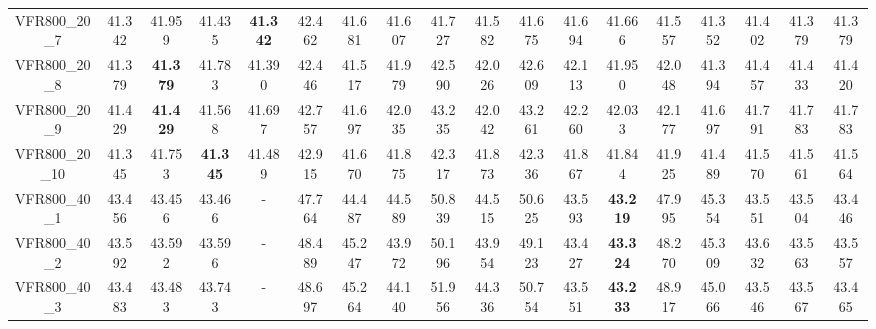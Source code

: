 \begin{tabular}{cc|ccc|ccccccccccccc}
VFR800\_20\_7      & 41.342           & 41.959           & 41.435           & {\bf 41.342}     & 42.462           & 41.681           & 41.607           & 41.727           & 41.582           & 41.675           & 41.694           & 41.666           & 41.557           & 41.352           & 41.402           & 41.379           & 41.379          \\ 
VFR800\_20\_8      & 41.379           & {\bf 41.379}     & 41.783           & 41.390           & 42.446           & 41.517           & 41.979           & 42.590           & 42.026           & 42.609           & 42.113           & 41.950           & 42.048           & 41.394           & 41.457           & 41.433           & 41.420          \\ 
VFR800\_20\_9      & 41.429           & {\bf 41.429}     & 41.568           & 41.697           & 42.757           & 41.697           & 42.035           & 43.235           & 42.042           & 43.261           & 42.260           & 42.033           & 42.177           & 41.697           & 41.791           & 41.783           & 41.783          \\ 
VFR800\_20\_10     & 41.345           & 41.753           & {\bf 41.345}     & 41.489           & 42.915           & 41.670           & 41.875           & 42.317           & 41.873           & 42.336           & 41.867           & 41.844           & 41.925           & 41.489           & 41.570           & 41.561           & 41.564          \\ 
VFR800\_40\_1      & 43.456           & 43.456           & 43.466           & -                & 47.764           & 44.487           & 44.589           & 50.839           & 44.515           & 50.625           & 43.593           & {\bf 43.219}     & 47.995           & 45.354           & 43.551           & 43.504           & 43.446          \\ 
VFR800\_40\_2      & 43.592           & 43.592           & 43.596           & -                & 48.489           & 45.247           & 43.972           & 50.196           & 43.954           & 49.123           & 43.427           & {\bf 43.324}     & 48.270           & 45.309           & 43.632           & 43.563           & 43.557          \\ 
VFR800\_40\_3      & 43.483           & 43.483           & 43.743           & -                & 48.697           & 45.264           & 44.140           & 51.956           & 44.336           & 50.754           & 43.551           & {\bf 43.233}     & 48.917           & 45.066           & 43.546           & 43.567           & 43.465          \\ 

\end{tabular}
